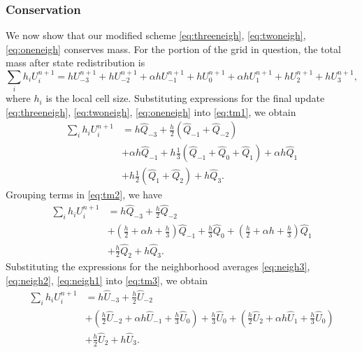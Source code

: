 \subsubsection*{Conservation}
We now show that our modified scheme \eqref{eq:threeneigh}, \eqref{eq:twoneigh}, \eqref{eq:oneneigh} conserves mass.
For the portion of the grid in question, the total mass after state redistribution is
\begin{equation}\label{eq:tm1}
	\sum_{i} h_i U^{n+1}_i  = h U^{n+1}_{-3} + h U^{n+1}_{-2} + \alpha h U^{n+1}_{-1} +h U^{n+1}_0+\alpha h U^{n+1}_{1} + h U^{n+1}_{2} + h U^{n+1}_{3},
\end{equation}
where $h_i$ is the local cell size.
Substituting expressions for the final update \eqref{eq:threeneigh}, \eqref{eq:twoneigh}, \eqref{eq:oneneigh} into \eqref{eq:tm1}, we obtain
\begin{equation}\label{eq:tm2}
\begin{aligned}
\sum_{i} h_i U^{n+1}_i  &= h \widehat{Q}_{-3} + \frac{h}{2}(\widehat{Q}_{-1}+\widehat{Q}_{-2}) \\
&+ \alpha h \widehat{Q}_{-1} +h \frac{1}{3}(\widehat{Q}_{-1}+\widehat{Q}_{0}+\widehat{Q}_{1})+\alpha h \widehat{Q}_{1} \\
&+ h \frac{1}{2}(\widehat{Q}_{1}+\widehat{Q}_{2}) + h \widehat{Q}_{3}.
\end{aligned}
\end{equation}
Grouping terms in \eqref{eq:tm2}, we have
\begin{equation}\label{eq:tm3}
\begin{aligned}
\sum_{i} h_i U^{n+1}_i  &= h \widehat{Q}_{-3} + \frac{h}{2}\widehat{Q}_{-2} \\
&+ \left(\frac{h}{2}+\alpha h + \frac{h}{3}\right) \widehat{Q}_{-1} + \frac{h}{3} \widehat{Q}_0 + \left(\frac{h}{2}+\alpha h + \frac{h}{3}\right) \widehat{Q}_{1} \\
&+ \frac{h}{2}\widehat{Q}_{2} + h \widehat{Q}_3.
\end{aligned}
\end{equation}
Substituting the expressions for the neighborhood averages \eqref{eq:neigh3}, \eqref{eq:neigh2}, \eqref{eq:neigh1} into \eqref{eq:tm3}, we obtain
\begin{equation}\label{eq:tm4}
\begin{aligned}
\sum_{i} h_i U^{n+1}_i  &= h \widehat{U}_{-3} + \frac{h}{2}\widehat{U}_{-2} \\
&+ \left(\frac{h}{2} \widehat{U}_{-2} + \alpha h \widehat{U}_{-1} + \frac{h}{3}\widehat{U}_{0}\right) + \frac{h}{3} \widehat{U}_0 + \left(\frac{h}{2} \widehat{U}_{2} + \alpha h \widehat{U}_{1} + \frac{h}{3}\widehat{U}_{0}\right) \\
&+ \frac{h}{2}\widehat{U}_{2} + h \widehat{U}_3.
\end{aligned}
\end{equation}
